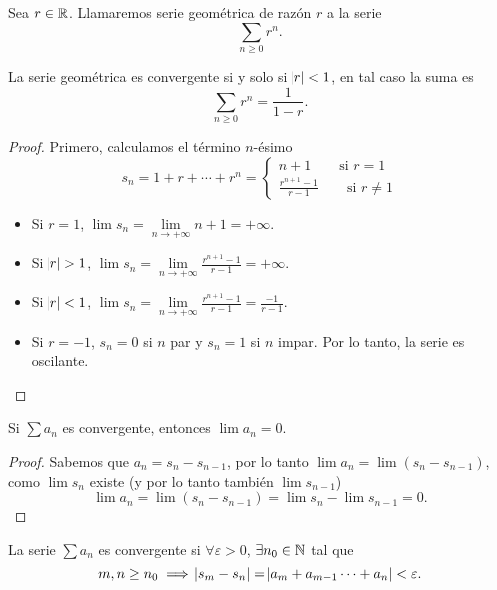 \begin{defi}
    Sea $r \in \mathbb{R}$. Llamaremos serie geométrica de razón $r$ a la serie
    \[
        \sum_{n \geq 0} r^n.
    \]
\end{defi}

\begin{prop*}
    La serie geométrica es convergente si y solo si $\abs{r} < 1$, en tal caso
    la suma es
    \[
        \sum_{n \geq 0} r^n = \frac{1}{1-r}.
    \]
\end{prop*}

\begin{proof}
    Primero, calculamos el término $n$-ésimo
    \[
        s_n = 1 + r + \cdots + r^n = \begin{cases}
            n+1 \qquad \text{si } r = 1 \\
            \frac{r^{n+1} - 1 }{r-1} \qquad \text{si } r \neq 1
        \end{cases}
    \]
    \begin{itemize}
        \item Si $r = 1$, $\lim s_n = \lim\limits_{n  \to +\infty} n+1 = +\infty$.
        \item Si $\abs{r} > 1$, $\lim s_n = \lim\limits_{n \to +\infty}
            \frac{r^{n+1} - 1}{r-1} = +\infty$.
        \item Si $\abs{r} < 1$, $\lim s_n = \lim\limits_{n \to +\infty}
            \frac{r^{n+1} - 1}{r-1} = \frac{-1}{r-1}$.
        \item Si $r = -1$, $s_n = 0$ si $n$ par y $s_n = 1$ si $n$ impar. Por
            lo tanto, la serie es oscilante.
    \end{itemize}
\end{proof}

\begin{prop}
    Si $\sum a_n$ es convergente, entonces $\lim a_n = 0$.
\end{prop}

\begin{proof}
    Sabemos que $a_n = s_n - s_{n-1}$, por lo tanto
    $\lim a_n = \lim (s_n - s_{n-1})$, como $\lim s_n$ existe (y por lo tanto
    también $\lim s_{n-1}$)
    \[
        \lim a_n = \lim (s_n - s_{n-1}) = \lim s_n - \lim s_{n-1} = 0.
    \]
\end{proof}

\begin{prop}
    La serie $\sum a_n$ es convergente si $\forall\varepsilon>0$,
    $\exists n_0 \in \mathbb{N}$
    tal que
    \[
        m,n \geq n_0 \implies \abs{s_m - s_n} = \abs{a_m + a_{m-1} \cdots + a_n} <
        \varepsilon.
    \]
\end{prop}

